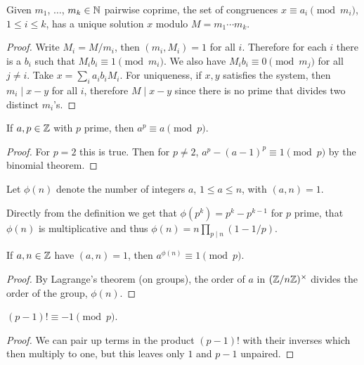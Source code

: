 \documentclass[a4paper, 10pt, twocolumn]{amsart}
\begin{document}
\begin{theorem}
    Given $m_1$, $\dots$, $m_k \in \mathbb{N}$ pairwise coprime, the set of congruences $x \equiv a_i \pmod{m_i}$, $1 \leq i \leq k$, has a unique solution $x$ modulo $M = m_1 \cdots m_k$.
\end{theorem}
\begin{proof}
  Write $M_i=M / m_i$, then $\left(m_i, M_i\right)=1$ for all $i$. Therefore for each $i$ there is a $b_i$ such that $M_i b_i \equiv 1\pmod{m_i}$. We also have $M_i b_i \equiv 0 \pmod{m_j}$ for all $j \neq i$. Take $x=\sum_i a_i b_i M_i$. For uniqueness, if $x, y$ satisfies the system, then $m_i \mid x-y$ for all $i$, therefore $M \mid x-y$ since there is no prime that divides two distinct $m_i$'s.
\end{proof}

\begin{theorem}
  If $a, p \in \mathbb{Z}$ with $p$ prime, then $a^p \equiv a \pmod{p}$.
\end{theorem}
\begin{proof}
  For $p = 2$ this is true. Then for $p \neq 2$, $a^p - (a-1)^p \equiv 1 \pmod{p}$ by the binomial theorem. 
\end{proof}

\begin{definition}
Let $\phi(n)$ denote the number of integers $a$, $1 \leq a \leq n$, with $(a, n) = 1$.
\end{definition}

\begin{remark}
  Directly from the definition we get that $\phi(p^k) = p^k - p^{k-1}$ for $p$ prime, that $\phi(n)$ is multiplicative and thus $\phi(n) = n \prod_{p \mid n} (1 - 1/p)$.
\end{remark}

\begin{theorem}
  If $a, n \in \mathbb{Z}$ have $(a, n) = 1$, then $a^{\phi(n)} \equiv 1 \pmod{p}$.
\end{theorem}
\begin{proof}
By Lagrange's theorem (on groups), the order of $a$ in $(\mathbb{Z}/n\mathbb{Z})^\times$ divides the order of the group, $\phi(n)$.
\end{proof}

\begin{theorem}[Wilson]
$(p - 1)! \equiv -1 \pmod{p}$.
\end{theorem}
\begin{proof}
  We can pair up terms in the product $(p-1)!$ with their inverses which then multiply to one, but this leaves only $1$ and $p - 1$ unpaired.
\end{proof}
\end{document}
